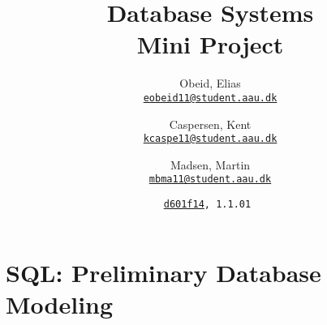 \documentclass[a4paper, 12pt, twoside, article]{memoir}
\title{Database Systems\\Mini Project}
\date{\texttt{\href{mailto:d601f14@cs.aau.dk}{d601f14}, 1.1.01
} \\ \protect\formatdate{6}{2}{2014}}
\author{
  Obeid, Elias\\
  \href{mailto:eobeid11@student.aau.dk}{\texttt{eobeid11@student.aau.dk}}
  \and
  Caspersen, Kent\\
  \href{mailto:kcaspe11@student.aau.dk}{\texttt{kcaspe11@student.aau.dk}}
  \and
  Madsen, Martin\\
  \href{mailto:mbma11@student.aau.dk}{\texttt{mbma11@student.aau.dk}}
}
\begin{document}
\frontmatter

\maketitle
\pagebreak

\mainmatter



\appendix

\chapter{SQL: Preliminary Database Modeling}\label{sec:sqlPre}
\inputminted{sql}{1-06.02.14/selfStudy1db.sql}
\end{document}
